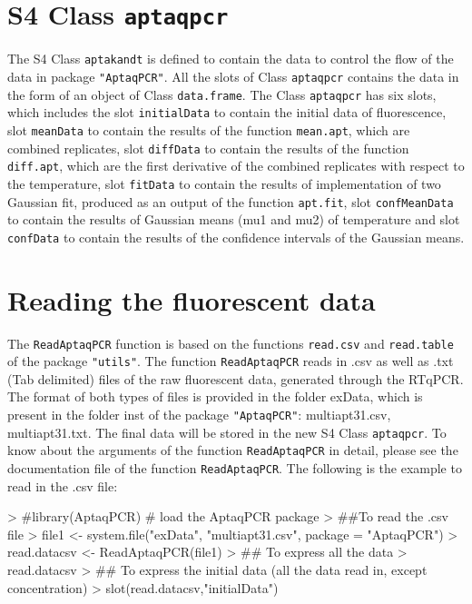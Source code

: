 \documentclass[11pt]{article}
\newcommand{\code}[1]{{\tt #1}}
\newcommand{\pkg}[1]{{\tt "#1"}}
\begin{document}
\section {S4 Class \code{aptaqpcr}}
The S4 Class \code{aptakandt} is defined to contain the data to control the flow of the data in package \pkg{AptaqPCR}. All the slots of Class \code{aptaqpcr} contains the data in the form of an object of Class \code{data.frame}. The Class \code{aptaqpcr} has six slots, which includes the slot
\code{initialData} to contain the initial data of fluorescence, slot \code{meanData} to contain the results of the function \code{mean.apt}, which are combined replicates, slot \code{diffData} to contain the results of the function \code{diff.apt}, which are the first derivative of the combined replicates with respect to the temperature, slot \code{fitData} to contain the results of implementation of two Gaussian fit, produced as an output of the function \code{apt.fit}, slot \code{confMeanData} to contain the results of Gaussian means (mu1 and mu2) of temperature and slot \code{confData} to contain the results of the confidence intervals of the Gaussian means.

\section{Reading the fluorescent data}
The \code{ReadAptaqPCR} function is based on the functions \code{read.csv} and \code{read.table} of the package \pkg{utils}. The function \code{ReadAptaqPCR} reads in .csv as well as .txt (Tab delimited) files of the raw fluorescent data, generated through the RTqPCR. The format of both types of files is provided in the folder exData, which is present in the folder inst of the package \pkg{AptaqPCR}: multiapt31.csv, multiapt31.txt. The final data will be stored in the new S4 Class \code{aptaqpcr}. To know about the arguments of the function \code{ReadAptaqPCR} in detail, please see the documentation file of the function \code{ReadAptaqPCR}. The following is the example to read in the .csv file:

\begin{Schunk}
\begin{Sinput}
> #library(AptaqPCR) # load the AptaqPCR package
> ##To read the .csv file
> file1 <- system.file("exData", "multiapt31.csv", package = "AptaqPCR")
> read.datacsv <- ReadAptaqPCR(file1)
> ## To express all the data
> read.datacsv
> ## To express the initial data (all the data read in, except concentration)
> slot(read.datacsv,"initialData")
\end{Sinput}
\end{Schunk}
\end{document}
